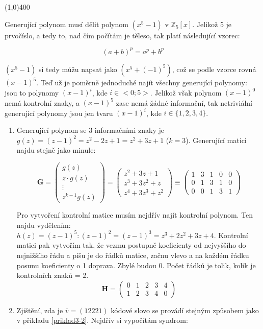 \documentclass{article}
\begin{document}
\line(1,0){400}

Generující polynom musí dělit polynom $(x^5 - 1) \mbox{ v } \mathbb{Z}_5[x]$. Jelikož 5 je prvočíslo, a tedy to, nad čím počítám je těleso, tak platí následující vzorec:

\[ (a+b)^p = a^p + b^p \]

$(x^5 - 1)$ si tedy můžu napsat jako $(x^5 + (-1)^5)$, což se podle vzorce rovná $(x-1)^5$. Teď už je poměrně jednoduché najít všechny generující polynomy: jsou to polynomy $(x-1)^i$, kde $i \in <0;5>$. Jelikož však polynom $(x-1)^0$ nemá kontrolní znaky, a $(x-1)^5$ zase nemá žádné informační, tak netriviální generující polynomy jsou jen tvaru $(x-1)^i$, kde $i \in \{1,2,3,4\}$.

\begin{enumerate}
	\item Generující polynom se 3 informačními znaky je $g(z) = (z-1)^2 = z^2 - 2z + 1 = z^2 + 3z + 1$ ($k=3$). Generující matici najdu stejně jako minule: 

\[ \mathbf{G} = \begin{pmatrix}
  g(z) \\
  z\cdot g(z) \\
  \vdots \\
  z^{k-1}g(z)
	\end{pmatrix} = 
	\begin{pmatrix}
  z^2 + 3z + 1\\
  z^3 + 3z^2 + z\\
  z^4 + 3z^3 + z^2 
	\end{pmatrix} \equiv
	\begin{pmatrix}
  1 & 3 & 1 & 0 & 0\\
  0 & 1 & 3 & 1 & 0\\
  0 & 0 & 1 & 3 & 1
	\end{pmatrix}
	\]
	
	Pro vytvoření kontrolní matice musím nejdřív najít kontrolní polynom. Ten najdu vydělením: $h(z) = (z-1)^5:(z-1)^2 = (z-1)^3 = z^3 + 2z^2 + 3z + 4$. Kontrolní matici pak vytvořím tak, že vezmu postupně koeficienty od nejvyššího do nejnižšího řádu a píšu je do řádků matice, začnu vlevo a na každém řádku posunu koeficienty o 1 doprava. Zbylé budou 0. Počet řádků je tolik, kolik je kontrolních znaků = 2.
\[
 \mathbf{H} = \begin{pmatrix}
  0 & 1 & 2 & 3 & 4\\
  1 & 2 & 3 & 4 & 0 
 \end{pmatrix} 
\]	
	
	\item Zjištění, zda je $\bar{v} = (12221)$ kódové slovo se provádí stejným způsobem jako v příkladu \ref{priklad3-2}. Nejdřív si vypočítám syndrom:
	

\end{enumerate}
\end{document}

